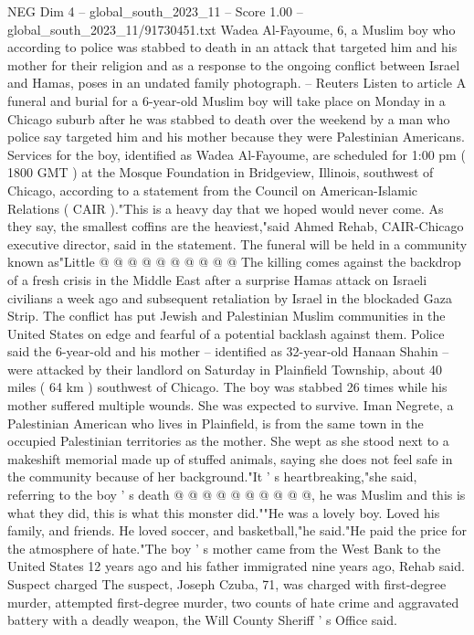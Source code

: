 \begin{textsample}{NEG Dim 4 – global\_south\_2023\_11 – Score 1.00 – global\_south\_2023\_11/91730451.txt}  \label{ex:f4_neg_302}
Wadea Al-Fayoume, 6, a Muslim boy who according to police was stabbed to death in an attack that targeted him and his mother for their religion and as a response to the ongoing conflict between Israel and Hamas, poses in an undated family photograph. -- Reuters Listen to article A funeral and burial for a 6-year-old Muslim boy will take place on Monday in a Chicago suburb after he was stabbed to death over the weekend by a man who police say targeted him and his mother because they were Palestinian Americans.
Services for the boy, identified as Wadea Al-Fayoume, are scheduled for 1:00 pm ( 1800 GMT ) at the Mosque Foundation in Bridgeview, Illinois, southwest of Chicago, according to a statement from the Council on American-Islamic Relations ( CAIR )."This is a heavy day that we hoped would never come.
As they say, the smallest coffins are the heaviest,"said Ahmed Rehab, CAIR-Chicago executive director, said in the statement.
The funeral will be held in a community known as"Little @ @ @ @ @ @ @ @ @ @ The killing comes against the backdrop of a fresh crisis in the Middle East after a surprise Hamas attack on Israeli civilians a week ago and subsequent retaliation by Israel in the blockaded Gaza Strip.
The conflict has put Jewish and Palestinian Muslim communities in the United States on edge and fearful of a potential backlash against them.
Police said the 6-year-old and his mother -- identified as 32-year-old Hanaan Shahin -- were attacked by their landlord on Saturday in Plainfield Township, about 40 miles ( 64 km ) southwest of Chicago.
The boy was stabbed 26 times while his mother suffered multiple wounds.
She was expected to survive.
Iman Negrete, a Palestinian American who lives in Plainfield, is from the same town in the occupied Palestinian territories as the mother.
She wept as she stood next to a makeshift memorial made up of stuffed animals, saying she does not feel safe in the community because of her background."It ' s heartbreaking,"she said, referring to the boy ' s death @ @ @ @ @ @ @ @ @ @, he was Muslim and this is what they did, this is what this monster did.""He was a lovely boy.
Loved his family, and friends.
He loved soccer, and basketball,"he said."He paid the price for the atmosphere of hate."The boy ' s mother came from the West Bank to the United States 12 years ago and his father immigrated nine years ago, Rehab said.
Suspect charged The suspect, Joseph Czuba, 71, was charged with first-degree murder, attempted first-degree murder, two counts of hate crime and aggravated battery with a deadly weapon, the Will County Sheriff ' s Office said.

\end{textsample}
